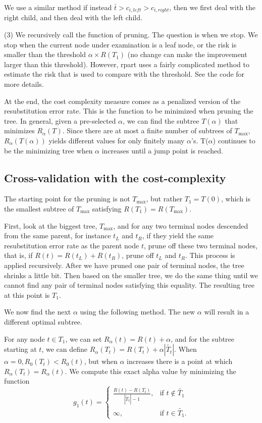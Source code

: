 We use a similar method if instead $\bar{t} > c_{i,left} >
c_{i,right}$, then we first deal with the right child, and then deal
with the left child.

(3) We recursively call the function of pruning. The question is when
we stop. We stop when the current node under examination is a leaf
node, or the risk is smaller than the threshold $\alpha\times R(T_1)$
(no change can make the improvement larger than this threshold).
However, rpart uses a fairly complicated method to estimate the risk
that is used to compare with the threshold. See the code for more
details.

At the end, the cost complexity measure comes as a penalized version
of the resubstitution error rate. This is the function to be minimized
when pruning the tree. In general, given a pre-selected $\alpha$, we
can find the subtree $T(\alpha)$ that minimizes $R_\alpha(T)$. Since
there are at most a finite number of subtrees of $T_{\text{max}}$,
$R_\alpha(T(\alpha))$ yields different values for only finitely many
$\alpha$'s. T($\alpha$) continues to be the minimizing tree when
$\alpha$ increases until a jump point is reached.

\subsection{Cross-validation with the cost-complexity}

The starting point for the pruning is not $T_{\text{max}}$, but rather
$T_1 = T(0)$, which is the smallest subtree of $T_{\text{max}}$ satisfying
$R(T_1) = R(T_{\text{max}})$.

First, look at the biggest tree, $T_{\text{max}}$, and for any two terminal
nodes descended from the same parent, for instance $t_L$ and $t_R$, if they
yield the same resubstitution error rate as the parent node $t$, prune off these
two terminal nodes, that is, if $R(t) = R(t_L) + R(t_R)$, prune off $t_L$ and
$t_R$. This process is applied recursively. After we have pruned one pair of
terminal nodes, the tree shrinks a little bit. Then based on the smaller tree,
we do the same thing until we cannot find any pair of terminal nodes satisfying
this equality. The resulting tree at this point is $T_1$.

We now find the next $\alpha$ using the following method. The new
$\alpha$ will result in a different optimal subtree.

For any node $t \in T_1$, we can set $R_\alpha({t}) = R(t) + \alpha$, and for
the subtree starting at $t$, we can define $R_\alpha(T_t) = R(T_t) + \alpha |\tilde{T_t}|$.
When $\alpha = 0, R_0(T_t) < R_0({t})$, but when $\alpha$ increases there is a point
at which $R_\alpha(T_t) = R_\alpha({t})$. We compute this exact alpha value by minimizing the
function
\begin{equation*}
    g_1(t) = \begin{cases}
                \frac{R(t) - R(T_t)}{|\tilde{T_t}| - 1},  & \mbox{if } t \notin \tilde{T_1} \\
                \infty, & \mbox{if } t \in \tilde{T_1}.
             \end{cases}
\end{equation*}


